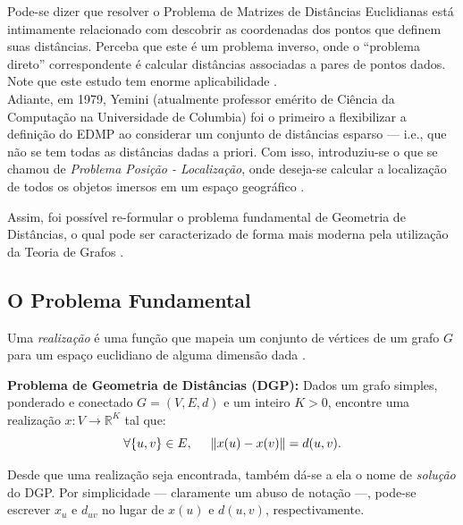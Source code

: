 \documentclass[a4paper,12pt]{article}
\begin{document}
Pode-se dizer que resolver o Problema de Matrizes de Distâncias Euclidianas está intimamente relacionado com descobrir as coordenadas dos pontos que definem suas distâncias. Perceba que este é um problema inverso, onde o ``problema direto'' correspondente é calcular distâncias associadas a pares de pontos dados. Note que este estudo tem enorme aplicabilidade \cite{carlileGDandAplications}.
\\

Adiante, em 1979, Yemini (atualmente professor emérito de Ciência da Computação na Universidade de Columbia) foi o primeiro a flexibilizar a definição do EDMP ao considerar um conjunto de distâncias esparso \cite{Yemini:79,carlileGDandAplications} --- i.e., que não se tem todas as distâncias dadas a priori. Com isso, introduziu-se o que se chamou de \textit{Problema Posição - Localização}, onde deseja-se calcular a localização de todos os objetos imersos em um espaço geográfico \cite{Yemini:79}. 

Assim, foi possível re-formular o problema fundamental de Geometria de Distâncias, o qual pode ser caracterizado de forma mais moderna pela utilização da Teoria de Grafos \cite{carlileGDandAplications}.

\subsection{O Problema Fundamental}

Uma \textit{realização} é uma função que mapeia um conjunto de vértices de um grafo $G$ para um espaço euclidiano de alguma dimensão dada \cite{libertiEDG}.

\begin{center}
	\begin{minipage}{0.9 \linewidth}
		\textbf{Problema de Geometria de Distâncias (DGP):} Dados um grafo simples, ponderado e conectado $G = (V, E, d)$ e um inteiro $K>0$, encontre uma realização $x: V \longrightarrow \mathbb{R}^K$ tal que:
		\begin{equation}
		\forall \{u,v\} \in E, \hspace{0.5cm} \lVert x(u) - x(v) \rVert = d(u,v). \label{eq:DGP}
		\end{equation}
	\end{minipage}
\end{center}

Desde que uma realização seja encontrada, também dá-se a ela o nome de \textit{solução} do DGP. Por simplicidade --- claramente um abuso de notação ---, pode-se escrever $x_u$ e $d_{uv}$ no lugar de $x(u)$ e $d(u,v)$, respectivamente.
\end{document}
